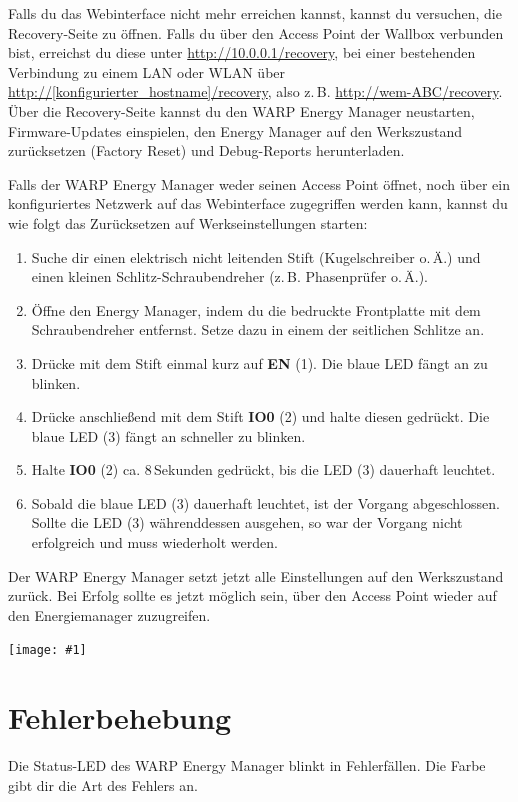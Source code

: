 \documentclass[a4paper,10pt]{article}
\newcommand{\gfx}[1]{\texttt{[image: \#1]}}
\begin{document}
\begin{multicols*}{2}
	Falls du das Webinterface nicht mehr erreichen kannst, kannst du versuchen, die Recovery-Seite zu öffnen.
	Falls du über den Access Point der Wallbox verbunden bist, erreichst du diese unter \url{http://10.0.0.1/recovery},
	bei einer bestehenden Verbindung zu einem LAN oder WLAN über
	\url{http://[konfigurierter_hostname]/recovery}, also z.\,B. \url{http://wem-ABC/recovery}.
	Über die Recovery-Seite kannst du den WARP Energy Manager neustarten, Firmware-Updates einspielen,
	den Energy Manager auf den Werkszustand zurücksetzen (Factory Reset) und Debug-Reports
	herunterladen.

	Falls der WARP Energy Manager weder seinen Access Point öffnet, noch über ein konfiguriertes Netzwerk auf das Webinterface zugegriffen werden kann,
	kannst du wie folgt das Zurücksetzen auf Werkseinstellungen starten:
	\begin{enumerate}
	 \item Suche dir einen elektrisch nicht leitenden Stift (Kugelschreiber o.\,Ä.) und einen kleinen Schlitz-Schraubendreher (z.\,B. Phasenprüfer o.\,Ä.).
	 \item Öffne den Energy Manager, indem du die bedruckte Frontplatte mit dem Schraubendreher entfernst. Setze dazu in einem der seitlichen Schlitze an.
	 \item Drücke mit dem Stift einmal kurz auf \textbf{EN} (1). Die blaue LED fängt an zu blinken.
	 \item Drücke anschließend mit dem Stift \textbf{IO0} (2) und halte diesen gedrückt. Die blaue LED (3) fängt an schneller zu blinken.
	 \item Halte \textbf{IO0} (2) ca. 8\,Sekunden gedrückt, bis die LED (3) dauerhaft leuchtet.
	 \item Sobald die blaue LED (3) dauerhaft leuchtet, ist der Vorgang abgeschlossen. Sollte die LED (3) währenddessen ausgehen, so war der Vorgang nicht erfolgreich und muss wiederholt werden.
	\end{enumerate}
	Der WARP Energy Manager setzt jetzt alle Einstellungen auf den Werkszustand zurück. Bei Erfolg sollte es jetzt möglich sein, über den Access Point wieder auf den Energiemanager zuzugreifen.

	\gfx{./img/resized/factory_reset_2}

	\newpage
	\section{Fehlerbehebung}
	\label{fehlerbehebung}
	Die Status-LED des WARP Energy Manager blinkt in Fehlerfällen. Die Farbe gibt dir die Art des Fehlers an.

\end{multicols*}
\end{document}
